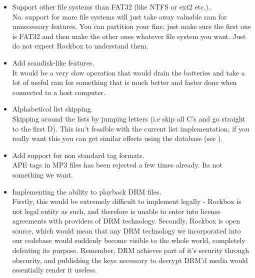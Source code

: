 \begin{itemize}
{  documentation.
}
\item Support other file systems than FAT32 (like NTFS or ext2 etc.).\\
  No.
  support for more file systems will just take away valuable ram for
  unnecessary features. You can partition your \dap{} fine, just make sure
  the first one is FAT32 and then make the other ones whatever file system
  you want. Just do not expect Rockbox to understand them.
\item Add scandisk{}-like features.\\
  It would be a very slow operation that would drain the batteries and
  take a lot of useful ram for something that is much better and faster
  done when connected to a host computer.
\item Alphabetical list skipping.\\
  Skipping around the lists by jumping letters (i.e skip all C's and go
  straight to the first D). This isn't feasible with the current list
  implementation, if you really want this you can get similar effects using
  the database (see ).
\item Add support for non standard tag formats.\\
APE tags in MP3 files has been rejected a few times already. Its not something we want.
\item Implementing the ability to playback DRM files.\\
  Firstly, this would be extremely difficult to implement legally - Rockbox
  is not legal entity as such, and therefore is unable to enter into license
  agreements with providers of DRM technology.
  Secondly, Rockbox is open source, which would mean that any DRM technology we
  incorporated into our codebase would suddenly become visible to the whole world,
  completely defeating its purpose. Remember, DRM achieves part of it's security
  through obscurity, and publishing the keys necessary to decrypt DRM'd 
  media would essentially render it useless.
\end{itemize}

